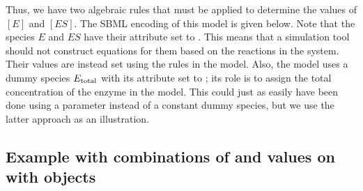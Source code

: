 Thus, we have two algebraic rules that must be applied to
determine the values of $[E]$ and $[ES]$.  The SBML encoding
of this model is given below.  Note that the species $E$ and $ES$
have their  attribute set to .
This means that a simulation tool should not construct equations
for them based on the reactions in the system.  Their values are
instead set using the rules in the model.  Also, the model uses a
dummy species $E\sub{total}$ with its  attribute
set to ; its role is to assign the total concentration
of the enzyme in the model.  This could just as easily have been
done using a parameter instead of a constant dummy species, but we
use the latter approach as an illustration.



\subsection{Example with combinations of
   and  values on 
  with  objects}
\label{sec:constantspecieseg}

